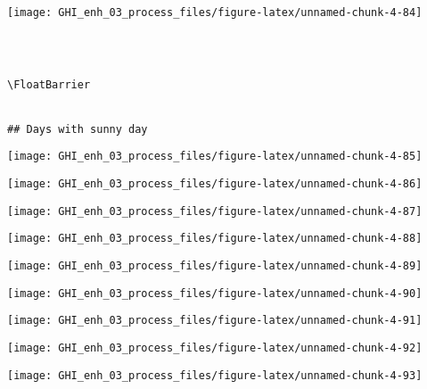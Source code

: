 \documentclass[
  10pt,
  a4paper,oneside]{article}
\begin{document}
\begin{center}\texttt{[image: GHI\_enh\_03\_process\_files/figure-latex/unnamed-chunk-4-84]} \end{center}

\begin{verbatim}
 
 

\FloatBarrier


## Days with sunny day 
\end{verbatim}

\begin{center}\texttt{[image: GHI\_enh\_03\_process\_files/figure-latex/unnamed-chunk-4-85]} \end{center}

\begin{center}\texttt{[image: GHI\_enh\_03\_process\_files/figure-latex/unnamed-chunk-4-86]} \end{center}

\begin{center}\texttt{[image: GHI\_enh\_03\_process\_files/figure-latex/unnamed-chunk-4-87]} \end{center}

\begin{center}\texttt{[image: GHI\_enh\_03\_process\_files/figure-latex/unnamed-chunk-4-88]} \end{center}

\begin{center}\texttt{[image: GHI\_enh\_03\_process\_files/figure-latex/unnamed-chunk-4-89]} \end{center}

\begin{center}\texttt{[image: GHI\_enh\_03\_process\_files/figure-latex/unnamed-chunk-4-90]} \end{center}

\begin{center}\texttt{[image: GHI\_enh\_03\_process\_files/figure-latex/unnamed-chunk-4-91]} \end{center}

\begin{center}\texttt{[image: GHI\_enh\_03\_process\_files/figure-latex/unnamed-chunk-4-92]} \end{center}

\begin{center}\texttt{[image: GHI\_enh\_03\_process\_files/figure-latex/unnamed-chunk-4-93]} \end{center}
\end{document}
